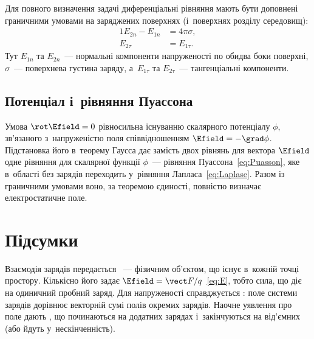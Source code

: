 Для повного визначення задачі диференціальні рівняння мають бути доповнені граничними
умовами на заряджених поверхнях (і~поверхнях розділу середовищ):
\begin{alignat}{1}
	E_{2n} - E_{1n} & = 4\pi\sigma, \\
	E_{2\tau}       & = E_{1\tau}.
\end{alignat}
Тут $E_{1n}$ та $E_{2n}$~--- нормальні компоненти напруженості по обидва боки поверхні,
$\sigma$~--- поверхнева густина заряду, а~$E_{1\tau}$ та $E_{2\tau}$~--- тангенціальні
компоненти.



\subsection*{Потенціал і~рівняння Пуассона}



Умова $\rot\Efield = 0$ рівносильна існуванню скалярного потенціалу $\phi$, зв'язаного
з~напруженістю поля співвідношенням $\Efield = - \grad\phi$. Підстановка його в~теорему
Гаусса дає замість двох рівнянь для вектора $\Efield$ одне рівняння для скалярної функції
$\phi$~--- рівняння Пуассона~\eqref{eq:Puasson}, яке в~області без зарядів переходить
у~рівняння Лапласа~\eqref{eq:Laplase}. Разом із граничними умовами воно, за теоремою
єдиності, повністю визначає електростатичне поле.



\section*{Підсумки}



 {}

Взаємодія зарядів передається ~--- фізичним об'єктом, що існує
в~кожній точці простору. Кількісно його задає  $\Efield=\vect
	F/q$~\eqref{eq:E}, тобто сила, що діє на одиничний пробний заряд. Для напруженості
справджується : поле системи зарядів дорівнює векторній сумі
полів окремих зарядів. Наочне уявлення про поле дають , що починаються
на додатних зарядах і~закінчуються на від'ємних (або йдуть у~нескінченність).

